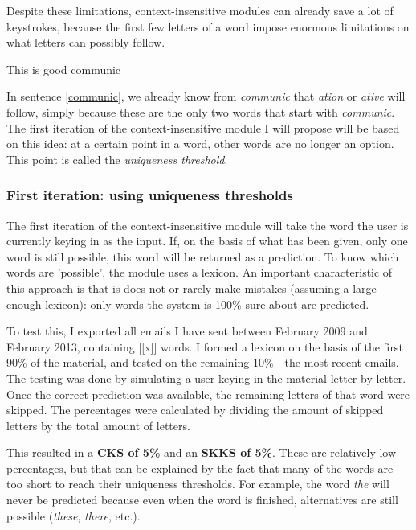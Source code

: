 \documentclass[12pt]{article}
\begin{document}
Despite these limitations, context-insensitive modules can already save a lot of keystrokes, because the first few letters of a word impose enormous limitations on what letters can possibly follow.

\begin{examples}
\item This is good communic \label{communic}
\end{examples}

In sentence \ref{communic}, we already know from \emph{communic} that \emph{ation} or \emph{ative} will follow, simply because these are the only two words that start with \emph{communic}. The first iteration of the context-insensitive module I will propose will be based on this idea: at a certain point in a word, other words are no longer an option. This point is called the \emph{uniqueness threshold}.

\subsubsection{First iteration: using uniqueness thresholds}

The first iteration of the context-insensitive module will take the word the user is currently keying in as the input. If, on the basis of what has been given, only one word is still possible, this word will be returned as a prediction. To know which words are 'possible', the module uses a lexicon. An important characteristic of this approach is that is does not or rarely make mistakes (assuming a large enough lexicon): only words the system is 100\% sure about are predicted.

To test this, I exported all emails I have sent between February 2009 and February 2013, containing [[x]] words. I formed a lexicon on the basis of the first 90\% of the material, and tested on the remaining 10\% - the most recent emails. The testing was done by simulating a user keying in the material letter by letter. Once the correct prediction was available, the remaining letters of that word were skipped. The percentages were calculated by dividing the amount of skipped letters by the total amount of letters.

This resulted in a \textbf{CKS of 5\%} and an \textbf{SKKS of 5\%}. These are relatively low percentages, but that can be explained by the fact that many of the words are too short to reach their uniqueness thresholds. For example, the word \emph{the} will never be predicted because even when the word is finished, alternatives are still possible (\emph{these}, \emph{there}, etc.).
\end{document}
